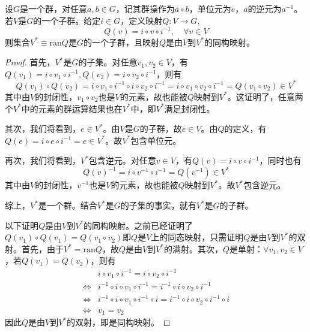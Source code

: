 \documentclass[../main.tex]{subfiles}
\begin{document}
\begin{lemma}\label{lem:A.3}
    设$G$是一个群，对任意$a,b\in G$，记其群操作为$a\circ b$，单位元为$e$，$a$的逆元为$a^{-1}$。若$V$是$G$的一个子群。给定$i\in G$，定义映射$Q:V\rightarrow G,$
    \[Q\left(v\right)=i\circ v\circ i^{-1},\quad\forall v\in V\]
    则集合$V^*\equiv\mathrm{ran}Q$是$G$的一个子群，且映射$Q$是由$V$到$V^*$的同构映射。
\end{lemma}
\begin{proof}
    首先，$V^*$是$G$的子集。对任意$v_1,v_2\in V$，有$Q\left(v_1\right)=i\circ v_1\circ i^{-1},Q\left(v_2\right)=i\circ v_2\circ i^{-1}$，则有
    \[Q\left(v_1\right)\circ Q\left(v_2\right)=i\circ v_1\circ i^{-1}\circ i\circ v_2\circ i^{-1}=i\circ v_1\circ v_2\circ i^{-1}=Q\left(v_1\circ v_2\right)\in V^*\]
    其中由$V$的封闭性，$v_1\circ v_2$也是$V$的元素，故也能被$Q$映射到$V^*$。这证明了，任意两个$V^*$中的元素的群运算结果也在$V^*$中，即$V^*$满足封闭性。

    其次，我们将看到，$e\in V^*$。由$V$是$G$的子群，故$e\in V$。由$Q$的定义，有$Q\left(e\right)=i\circ e\circ i^{-1}=e\in V^*$。故$V^*$包含单位元。

    再次，我们将看到，$V^*$包含逆元。对任意$v\in V$，有$Q\left(v\right)=i\circ v\circ i^{-1}$，同时也有
    \[Q\left(v\right)^{-1}=i\circ v^{-1}\circ i^{-1}=Q\left(v^{-1}\right)\in V^*\]
    其中由$V$的封闭性，$v^{-1}$也是$V$的元素，故也能被$Q$映射到$V^*$。故$V^*$包含逆元。

    综上，$V^*$是一个群。结合$V^*$是$G$的子集的事实，就有$V^*$是$G$的子群。

    以下证明$Q$是由$V$到$V^*$的同构映射。之前已经证明了$Q\left(v_1\right)\circ Q\left(v_1\right)=Q\left(v_1\circ v_2\right)$即$Q$是$V$上的同态映射，只需证明$Q$是由$V$到$V^*$的双射。首先，由于$V^*=\mathrm{ran}Q$，故$Q$是由$V$到$V^*$的满射。其次，$Q$是单射：$\forall v_1,v_2\in V$，若$Q\left(v_1\right)=Q\left(v_2\right)$，则有
    \[\begin{aligned}
                            & i\circ v_1\circ i^{-1}  =i\circ v_2\circ i^{-1}                                      \\
            \Leftrightarrow & i^{-1}\circ i\circ v_1\circ i^{-1}=i^{-1}\circ i\circ v_2\circ i^{-1}                \\
            \Leftrightarrow & i^{-1}\circ i\circ v_1\circ i^{-1}\circ i= i^{-1}\circ i\circ v_2\circ i^{-1}\circ i \\
            \Leftrightarrow & v_1=v_2
        \end{aligned}\]
    因此$Q$是由$V$到$V^*$的双射，即是同构映射。
\end{proof}
\end{document}
